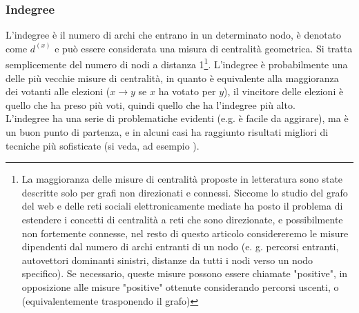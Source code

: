 \subsubsection{Indegree}
L'indegree è il numero di archi che entrano in un determinato nodo, è denotato come $d^(x)$ e può essere considerata una misura di centralità geometrica. Si tratta semplicemente del numero di nodi a distanza 1\footnote{La maggioranza delle misure di centralità proposte in letteratura sono state descritte solo per grafi non direzionati e connessi. Siccome lo studio del grafo del web e delle reti sociali elettronicamente mediate ha posto il problema di estendere i concetti di centralità a reti che sono direzionate, e possibilmente non fortemente connesse, nel resto di questo articolo considereremo le misure dipendenti dal numero di archi entranti di un nodo (e. g. percorsi entranti, autovettori dominanti sinistri, distanze da tutti i nodi verso un nodo specifico). Se necessario, queste misure possono essere chiamate "positive", in opposizione alle misure "positive" ottenute considerando percorsi uscenti, o (equivalentemente trasponendo il grafo)}. L'indegree è probabilmente una delle più vecchie misure di centralità, in quanto è equivalente alla maggioranza dei votanti alle elezioni ($x \rightarrow y$ se $x$ ha votato per $y$), il vincitore delle elezioni è quello che ha preso più voti, quindi quello che ha l'indegree più alto.\\
L'indegree ha una serie di problematiche evidenti (e.g. è facile da aggirare), ma è un buon punto di partenza, e in alcuni casi ha raggiunto risultati migliori di tecniche più sofisticate (si veda, ad esempio %
).
